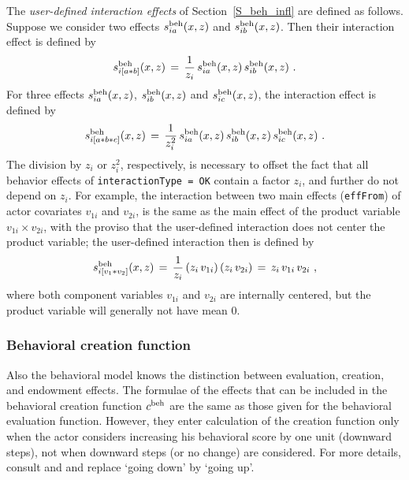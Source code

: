\documentclass[a4paper,fleqn,11pt]{article}
\newcommand{\+}{\, + \,}
\begin{document}
\noindent
The \emph{user-defined interaction effects} of Section~\ref{S_beh_infl}
are defined as follows.
Suppose we consider two effects $s^{\rm beh}_{ia}(x, z)$ and
$s^{\rm beh}_{ib}(x, z)$. Then their interaction effect is defined by
\begin{equation}
    s^{\rm beh}_{i [a\ast b] }(x, z) \,=\,
      \frac{1}{z_i} \, s^{\rm beh}_{ia}(x, z) \, s^{\rm beh}_{ib}(x, z) \ .
\end{equation}
For three effects $s^{\rm beh}_{ia}(x, z)$,
$s^{\rm beh}_{ib}(x, z)$ and $s^{\rm beh}_{ic}(x, z)$,
the interaction effect is defined by
\begin{equation}
    s^{\rm beh}_{i [a\ast b \ast c] }(x, z) \,=\,
      \frac{1}{z_i^2} \, s^{\rm beh}_{ia}(x, z) \,
                      s^{\rm beh}_{ib}(x, z) \, s^{\rm beh}_{ic}(x, z)\ .
\end{equation}
The division by $z_i$ or $z_i^2$, respectively, is necessary to offset the
fact that all behavior effects of \texttt{interactionType = OK} contain
a factor $z_i$, and further do not depend on $z_i$.
For example, the interaction between two main effects (\texttt{effFrom})
of actor covariates $v_{1i}$ and $v_{2i}$, is the same as
the main effect of the product variable $v_{1i}\times v_{2i}$,
with the proviso that the user-defined interaction does not center
the product variable;  the user-defined interaction
then is defined by
\begin{equation}
    s^{\rm beh}_{i [v_1\ast v_2] }(x, z) \,=\,
              \frac{1}{z_i}\, ( z_i \, v_{1i})  \, ( z_i \, v_{2i}) \,=\,
                      z_i \, v_{1i}\,v_{2i}  \ ,
\end{equation}
where both component variables $v_{1i}$ and $v_{2i}$
are internally centered, but the product variable will generally not have
mean 0.


\subsubsection{Behavioral creation function}
Also the behavioral model knows the distinction between evaluation,
creation, and
endowment effects. The formulae of the effects that can be included
in the behavioral creation function $c^{\rm beh}$ are the same as
those given for the behavioral evaluation function. However, they enter
calculation of the creation function only when the actor considers
increasing his behavioral score by one unit (downward steps), not
when downward steps (or no change) are considered. For more details,
consult
\citet*{SnijdersEA07} and \citet*{SteglichEA10}
and replace `going down' by `going up'.
\end{document}
